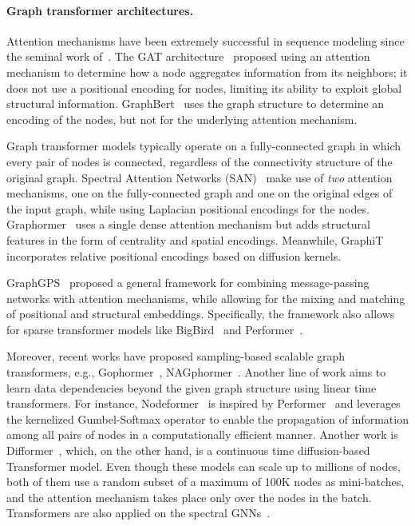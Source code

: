 \documentclass{article}
\theoremstyle{plain}
\theoremstyle{definition}
\theoremstyle{remark}
\begin{document}
\paragraph{Graph transformer architectures.} Attention mechanisms have been extremely successful in sequence modeling since the seminal work of~\citet{VaswaniSPUJGKP17}. The GAT architecture~\citep{velickovic2018graph} proposed 
using an attention mechanism to determine how a node aggregates
information from its neighbors; it does not 
use a positional encoding for nodes, limiting its
ability to exploit global structural information.
GraphBert~\citep{zhangGraphBert} uses the graph structure
to determine an encoding of the nodes, but not for the underlying attention mechanism.

Graph transformer models typically operate on a fully-connected graph in which every pair of nodes is 
connected, regardless of the connectivity structure of the original graph. Spectral Attention 
Networks (SAN)~\citep{kreuzer2021rethinking} make use of \emph{two} attention mechanisms, one on the fully-connected graph and one on the original edges of the input graph, while using Laplacian positional encodings for the nodes. Graphormer~\citep{Ying2021DoTR} uses a single dense attention mechanism but adds structural features in the form of centrality and spatial encodings. Meanwhile, GraphiT~\citep{MialonCSM21} incorporates relative positional encodings based on diffusion kernels.

GraphGPS~\citep{RampasekGDLWB22} proposed a general framework for combining message-passing networks with attention mechanisms, while allowing for the mixing and matching of positional and structural embeddings. Specifically, the framework also allows for sparse transformer models like BigBird~\citep{ZaheerGDAAOPRWY20} and Performer~\citep{ChoromanskiLDSG21}.

Moreover, recent works have proposed sampling-based scalable graph transformers, e.g., Gophormer~\citep{gophormer21}, NAGphormer~\citep{nagphormer22}. Another line of work aims to learn data dependencies beyond the given graph structure using linear time transformers. For instance, Nodeformer~\citep{wu2022nodeformer} is inspired by Performer~\citep{ChoromanskiLDSG21} and leverages the kernelized Gumbel-Softmax operator to enable the propagation of information among all pairs of nodes in a computationally efficient manner. Another work is Difformer~\citep{wu2023difformer}, which, on the other hand, is a continuous time diffusion-based Transformer model. Even though these models can scale up to millions of nodes, both of them use a random subset of a maximum of 100K nodes as mini-batches, and the attention mechanism takes place only over the nodes in the batch. Transformers are also applied on the spectral GNNs~\citep{bo2023specformer}.
\end{document}
